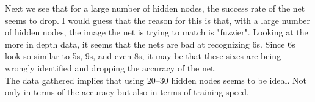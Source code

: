 \documentclass[12pt]{article}
\begin{document}
Next we see that for a large number of hidden nodes, the success rate of the net
seems to drop.  I would guess that the reason for this is that, with a large
number of hidden nodes, the image the net is trying to match is "fuzzier".
Looking at the more in depth data, it seems that the nets are bad at recognizing
6s.  Since 6s look so similar to 5s, 9s, and even 8s, it may be that these sixes
are being wrongly identified and dropping the accuracy of the net. \\

The data gathered implies that using 20--30 hidden nodes seems to be ideal.  Not
only in terms of the accuracy but also in terms of training speed. \\
\end{document}
